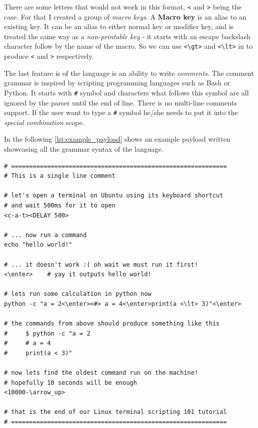 There are some letters that would not work in this format, \verb|<| and \verb|>| being the case. For that I created a group of \emph{macro keys}. A \textbf{Macro key} is an alias to an existing key. It can be an alias to either normal key or modifier key, and is treated the same way as a \emph{non-printable key} \-- it starts with an escape backslash character follow by the name of the macro. So we can use \verb|<\gt>| and \verb|<\lt>| in to produce \verb|<| and \verb|>| respectively. 

The last feature is of the language is an ability to write \emph{comments}. The comment grammar is inspired by scripting programming languages such as Bash or Python. It starts with \verb|#| symbol and characters what follows this symbol are all ignored by the parser until the end of line. There is no multi-line comments support. If the user want to type a \verb|#| symbol he/she needs to put it into the \emph{special combination} scope. 

In the following \autoref{lst:example_payload} shows an example payload written showcasing all the grammar syntax of the language.
\begin{lstlisting}[caption={Example payload in custom language.},
                   label={lst:example_payload}]
# ============================================================
# This is a single line comment

# let's open a terminal on Ubuntu using its keyboard shortcut
# and wait 500ms for it to open
<c-a-t><DELAY 500>

# ... now run a command
echo "hello world!"

# ... it doesn't work :( oh wait we must run it first!
<\enter>    # yay it outputs hello world!

# lets run some calculation in python now
python -c "a = 2<\enter><#> a = 4<\enter>print(a <\lt> 3)"<\enter>

# the commands from above should produce something like this
#     $ python -c "a = 2
#     # a = 4
#     print(a < 3)"

# now lets find the oldest command run on the machine!
# hopefully 10 seconds will be enough
<10000-\arrow_up>

# that is the end of our Linux terminal scripting 101 tutorial
# ============================================================
\end{lstlisting}

